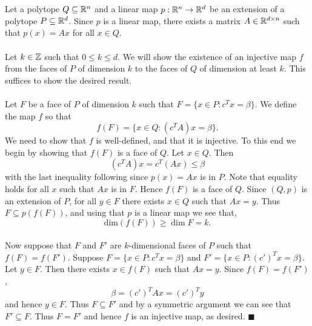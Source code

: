 \documentclass[letterpaper,12pt,oneside,onecolumn]{article}
\begin{document}
\section{}
\paragraph{}
Let a polytope $Q\subseteq \mathbb{R}^n$ and a linear map $p:\mathbb{R}^n \rightarrow \mathbb{R}^d$ be an extension of a polytope $P\subseteq \mathbb{R}^d$. Since $p$ is a linear map, there exists a matrix $A \in \mathbb{R}^{d\times n}$ such that $p(x) = Ax$ for all $x \in Q$.
\paragraph{}
Let $k \in \mathbb{Z}$ such that $0\leq k \leq d$. We will show the existence of an injective map $f$ from the faces of $P$ of dimension $k$ to the faces of $Q$ of dimension at least $k$. This suffices to show the desired result.
\paragraph{}
Let $F$ be a face of $P$ of dimension $k$ such that $F = \{x \in P: c^Tx = \beta\}$. We define the map $f$ so that
$$f(F) = \{x \in Q: (c^TA)x = \beta\}.$$
We need to show that $f$ is well-defined, and that it is injective. To this end we begin by showing that $f(F)$ is a face of $Q$. Let $x \in Q$. Then
$$(c^TA)x = c^T(Ax) \leq \beta$$
with the last inequality following since $p(x) = Ax$ is in $P$. Note that equality holds for all $x$ such that $Ax$ is in $F$. Hence $f(F)$ is a face of $Q$. Since $(Q,p)$ is an extension of $P$, for all $y \in F$ there exists $x \in Q$ such that $Ax = y$. Thus $F \subseteq p(f(F))$, and using that $p$ is a linear map we see that, 
$$\text{dim}(f(F)) \geq \dim F = k.$$
\paragraph{}
Now suppose that $F$ and $F'$ are $k$-dimensional faces of $P$ such that $f(F) = f(F')$. Suppose $F = \{x \in P: c^Tx = \beta\}$ and $F' = \{x \in P: (c')^Tx = \beta\}$. Let $y \in F$. Then there exists $x \in f(F)$ such that $Ax = y$. Since $f(F) = f(F')$,
$$\beta = (c')^TAx = (c')^Ty $$
and hence $y \in F$. Thus $F \subseteq F'$ and by a symmetric argument we can see that $F' \subseteq F$. Thus $F = F'$ and hence $f$ is an injective map, as desired. $\blacksquare$
\section{}
\end{document}
